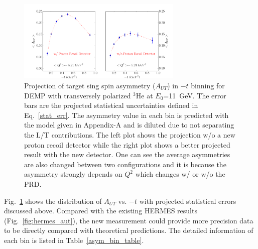 \begin{figure}[!ht]
 \begin{center}
      \includegraphics[type=pdf,
        ext=.pdf,read=.pdf,width=0.7\textwidth]{./figures/bin_asym_t}
      \caption{\footnotesize{Projection of target sing spin asymmetry
          ($A_{UT}$) in $-t$ binning for DEMP with transversely polarized
          $\mathrm{^{3}He}$ at $E_{0}$=11~GeV. The error bars are the projected
          statistical uncertainties defined in Eq.~\ref{stat_err}. The
          asymmetry value in each bin is predicted with the model given in
          Appendix-A and is diluted due to not separating the L/T
          contributions. The left plot shows the projection w/o a new proton
          recoil detector while the right plot shows a better projected result
          with the new detector. One can see the average asymmetries are also
          changed between two configurations and it is because the asymmetry
          strongly depends on $Q^{2}$ which changes w/ or w/o the PRD.}}
  \label{asym_t}
  \end{center}
\end{figure}
Fig.~\ref{asym_t} shows the distribution of $A_{UT}$ vs. $-t$ with projected
statistical errors discussed above. Compared with the existing HERMES results
(Fig.~\ref{fig:hermes_aut}), the new measurement could provide more precision
data to be directly compared with theoretical predictions. The detailed
information of each bin is listed in Table~\ref{asym_bin_table}.

